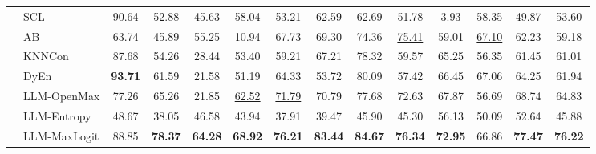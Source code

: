 \begin{tabular}{llcccccccccccc}
&SCL&\underline{90.64}&52.88&45.63&58.04&53.21&62.59&62.69&51.78&3.93&58.35&49.87&53.60\\
&AB&63.74&45.89&55.25&10.94&67.73&69.30&74.36&\underline{75.41}&59.01&\underline{67.10}&62.23&59.18\\
&KNNCon&87.68&54.26&28.44&53.40&59.21&67.21&78.32&59.57&65.25&56.35&61.45&61.01\\
&DyEn&\textbf{93.71}&61.59&21.58&51.19&64.33&53.72&80.09&57.42&66.45&67.06&64.25&61.94\\
&LLM-OpenMax&77.26&65.26&21.85&\underline{62.52}&\underline{71.79}&70.79&77.68&72.63&67.87&56.69&68.74&64.83\\
&LLM-Entropy&48.67&38.05&46.58&43.94&37.91&39.47&45.90&45.30&56.13&50.09&52.64&45.88\\
&LLM-MaxLogit&88.85&\textbf{78.37}&\textbf{64.28}&\textbf{68.92}&\textbf{76.21}&\textbf{83.44}&\textbf{84.67}&\textbf{76.34}&\textbf{72.95}&66.86&\textbf{77.47}&\textbf{76.22}\\
\cline{1-14}
\bottomrule
\end{tabular}
